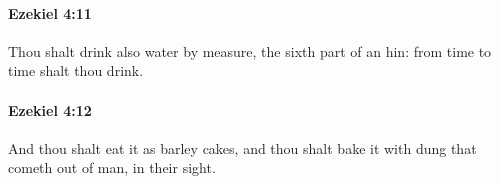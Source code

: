 		\paragraph{Ezekiel 4:11} %
			\label{EZEKIEL-4-11}

			Thou shalt drink also water by measure, the sixth part of an hin: from time to time shalt thou drink.


		\paragraph{Ezekiel 4:12} %
			\label{EZEKIEL-4-12}

			And thou shalt eat it as barley cakes, and thou shalt bake it with dung that cometh out of man, in their sight.


